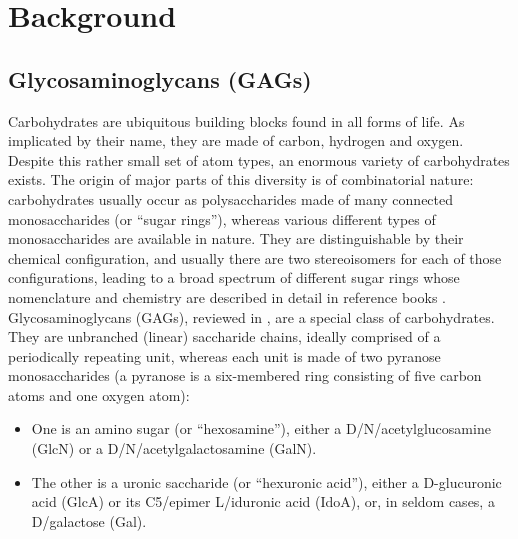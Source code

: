 \chapter{Background}
\label{background}

\section{Glycosaminoglycans (GAGs)}
\label{background:gags}

Carbohydrates are ubiquitous building blocks found in all forms of life. As
implicated by their name, they are made of carbon, hydrogen and oxygen. Despite
this rather small set of atom types, an enormous variety of carbohydrates
exists. The origin of major parts of this diversity is of combinatorial nature:
carbohydrates usually occur as polysaccharides made of many connected
monosaccharides (or \enquote{sugar rings}), whereas various different types of
monosaccharides are available in nature. They are distinguishable by their
chemical configuration, and usually there are two stereoisomers for each of
those configurations, leading to a broad spectrum of different sugar rings whose
nomenclature and chemistry are described in detail in reference books
\cite{carbohydrate_chemistry_robyt_1998, carbohydrate_chemistry_royal_2000}.
Glycosaminoglycans (GAGs), reviewed in
\cite{essentials_glycobiology_gags_chapter_2009}, are a special class of
carbohydrates. They are unbranched (linear) saccharide chains, ideally comprised
of a periodically repeating unit, whereas each unit is made of two pyranose
monosaccharides (a pyranose is a six-membered ring consisting of five carbon
atoms and one oxygen atom):


\begin{itemize}
\item One is an amino sugar (or \enquote{hexosamine}), either a
D\-/N\-/acetylglucosamine (GlcN) or a D\-/N\-/acetylgalactosamine (GalN).
\item The other is a uronic saccharide (or \enquote{hexuronic acid}), either a
D-glucuronic acid (GlcA) or its C5\-/epimer L\-/iduronic acid (IdoA), or, in
seldom cases, a D\-/galactose (Gal).
\end{itemize}



